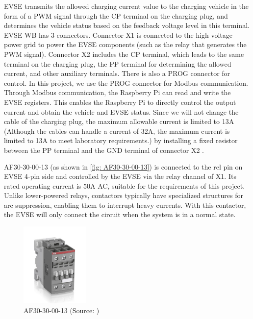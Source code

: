 \documentclass[
	english,
	ruledheaders=section,%
	class=report,%
	thesis={type=Report},%
	accentcolor=9c,%
	custommargins=true,%
	marginpar=false,%
	parskip=half-,%
	fontsize=11pt,%
	logofile={img/tuda_logo.pdf}, %
]{tudapub}
\begin{document}
EVSE transmits the allowed charging current value to the charging vehicle in the form of a PWM signal through the \ac{CP} terminal on the charging plug, and determines the vehicle status based on the feedback voltage level in this terminal. EVSE WB has 3 connectors. Connector X1 is connected to the high-voltage power grid to power the EVSE components (such as the relay that generates the PWM signal). Connector X2 includes the \ac{CP} terminal, which leads to the same terminal on the charging plug, the \ac{PP} terminal for determining the allowed current, and other auxiliary terminals. There is also a PROG connector for control. In this project, we use the PROG connector for Modbus communication. Through Modbus communication, the Raspberry Pi can read and write the EVSE registers. This enables the Raspberry Pi to directly control the output current and obtain the vehicle and EVSE status. Since we will not change the cable of the charging plug, the maximum allowable current is limited to 13A (Although the cables can handle a current of 32A, the maximum current is limited to 13A to meet laboratory requirements.) by installing a fixed resistor between the \ac{PP} terminal and the GND terminal of connector X2 \cite{EVSEdatasheet}.


AF30-30-00-13 (as shown in \autoref{fig: AF30-30-00-13}) is connected to the rel pin on EVSE 4-pin side and controlled by the EVSE via the relay channel of X1. Its rated operating current is 50A AC\cite{AF30-30-00-13}, suitable for the requirements of this project. Unlike lower-powered relays, contactors typically have specialized structures for arc suppression, enabling them to interrupt heavy currents. With this contactor, the EVSE will only connect the circuit when the system is in a normal state.

\begin{figure}[htbp]
    \centering
    \includegraphics[width=0.3\textwidth]{img/AF30-30-00-13.jpg}
    \caption{AF30-30-00-13
    (Source: \cite{AF30-30-00-13})}
    \label{fig: AF30-30-00-13}
\end{figure}
\end{document}
